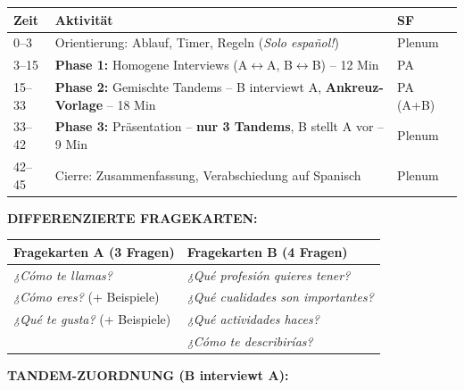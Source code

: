 \documentclass[11pt, a4paper]{article}
\newcommand{\es}[1]{\textcolor{spanisch}{\textit{#1}}}
\begin{document}
\begin{beobachtungsbox}[title={DS 10 -- BEOBACHTUNGSSTUNDE (Di, 03.02.2026)}]
\begin{tabular}{|p{1.2cm}|p{9cm}|p{3.5cm}|}
\hline
\rowcolor{red!10}
\textbf{Zeit} & \textbf{Aktivität} & \textbf{SF} \\
\hline
0--3 & Orientierung: Ablauf, Timer, Regeln (\es{Solo español!}) & Plenum \\
\hline
3--15 & \textbf{Phase 1:} Homogene Interviews (A$\leftrightarrow$A, B$\leftrightarrow$B) -- 12 Min & PA \\
\hline
15--33 & \textbf{Phase 2:} Gemischte Tandems -- B interviewt A, \textbf{Ankreuz-Vorlage} -- 18 Min & PA (A+B) \\
\hline
33--42 & \textbf{Phase 3:} Präsentation -- \textbf{nur 3 Tandems}, B stellt A vor -- 9 Min & Plenum \\
\hline
42--45 & Cierre: Zusammenfassung, Verabschiedung auf Spanisch & Plenum \\
\hline
\end{tabular}

\vspace{0.2cm}


\vspace{0.2cm}

\textbf{DIFFERENZIERTE FRAGEKARTEN:}

\begin{center}
\begin{tabular}{|p{6cm}|p{6cm}|}
\hline
\rowcolor{gruppeA!15}
\textbf{\textcolor{gruppeA}{Fragekarten A (3 Fragen)}} & \textbf{\textcolor{gruppeB}{Fragekarten B (4 Fragen)}} \\
\hline
\es{¿Cómo te llamas?} & \es{¿Qué profesión quieres tener?} \\
\es{¿Cómo eres?} (+ Beispiele) & \es{¿Qué cualidades son importantes?} \\
\es{¿Qué te gusta?} (+ Beispiele) & \es{¿Qué actividades haces?} \\
 & \es{¿Cómo te describirías?} \\
\hline
\end{tabular}
\end{center}

\vspace{0.2cm}

\textbf{TANDEM-ZUORDNUNG (B interviewt A):}


\end{beobachtungsbox}
\end{document}
